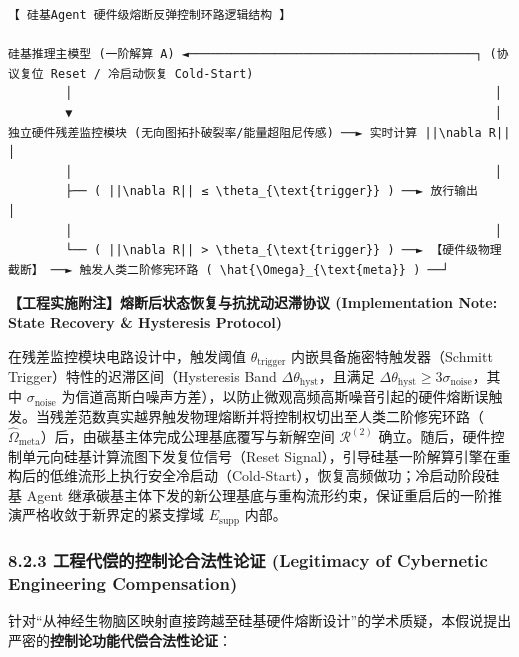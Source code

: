 \documentclass[11pt,a4paper,oneside]{ctexart}
\begin{document}
\begin{tcolorbox}[colback=gray!5!white,colframe=gray!50!black,fontupper=\ttfamily\small]
\begin{verbatim}
【 硅基Agent 硬件级熔断反弹控制环路逻辑结构 】

硅基推理主模型 (一阶解算 A) ◄────────────────────────────────────────┐ (协议复位 Reset / 冷启动恢复 Cold-Start)
        │                                                           │
        ▼                                                           │
独立硬件残差监控模块 (无向图拓扑破裂率/能量超阻尼传感) ──► 实时计算 ||\nabla R|| │
        │                                                           │
        ├── ( ||\nabla R|| ≤ \theta_{\text{trigger}} ) ──► 放行输出                      │
        │                                                           │
        └── ( ||\nabla R|| > \theta_{\text{trigger}} ) ──► 【硬件级物理截断】 ──► 触发人类二阶修宪环路 ( \hat{\Omega}_{\text{meta}} ) ──┘
\end{verbatim}
\end{tcolorbox}

\begin{notebox}
\textbf{【工程实施附注】熔断后状态恢复与抗扰动迟滞协议 (Implementation Note: State Recovery \& Hysteresis Protocol)}

在残差监控模块电路设计中，触发阈值 $\theta_{\text{trigger}}$ 内嵌具备施密特触发器（Schmitt Trigger）特性的迟滞区间（Hysteresis Band $\Delta \theta_{\text{hyst}}$，且满足 $\Delta \theta_{\text{hyst}} \ge 3\sigma_{\text{noise}}$，其中 $\sigma_{\text{noise}}$ 为信道高斯白噪声方差），以防止微观高频高斯噪音引起的硬件熔断误触发。当残差范数真实越界触发物理熔断并将控制权切出至人类二阶修宪环路（$\hat{\Omega}_{\text{meta}}$）后，由碳基主体完成公理基底覆写与新解空间 $\mathcal{R}^{(2)}$ 确立。随后，硬件控制单元向硅基计算流图下发复位信号（Reset Signal），引导硅基一阶解算引擎在重构后的低维流形上执行安全冷启动（Cold-Start），恢复高频做功；冷启动阶段硅基 Agent 继承碳基主体下发的新公理基底与重构流形约束，保证重启后的一阶推演严格收敛于新界定的紧支撑域 $E_{\text{supp}}$ 内部。
\end{notebox}

\subsubsection{8.2.3 工程代偿的控制论合法性论证 (Legitimacy of Cybernetic Engineering Compensation)}

针对“从神经生物脑区映射直接跨越至硅基硬件熔断设计”的学术质疑，本假说提出严密的\textbf{控制论功能代偿合法性论证}：
\end{document}
